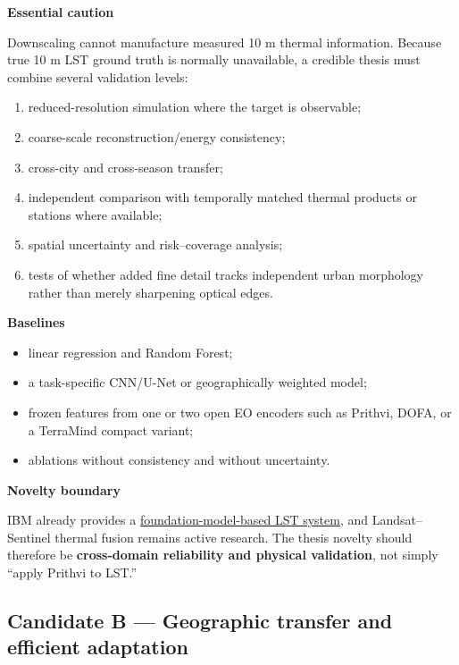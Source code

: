 \documentclass[
  a4paper,
  11pt]{article}
\providecommand{\tightlist}{%
  \setlength{\itemsep}{0pt}\setlength{\parskip}{0pt}}
\begin{document}
\textbf{Essential caution}

Downscaling cannot manufacture measured 10 m thermal information.
Because true 10 m LST ground truth is normally unavailable, a credible
thesis must combine several validation levels:

\begin{enumerate}
\def\labelenumi{\arabic{enumi}.}
\tightlist
\item
  reduced-resolution simulation where the target is observable;
\item
  coarse-scale reconstruction/energy consistency;
\item
  cross-city and cross-season transfer;
\item
  independent comparison with temporally matched thermal products or
  stations where available;
\item
  spatial uncertainty and risk--coverage analysis;
\item
  tests of whether added fine detail tracks independent urban morphology
  rather than merely sharpening optical edges.
\end{enumerate}

\textbf{Baselines}

\begin{itemize}
\tightlist
\item
  linear regression and Random Forest;
\item
  a task-specific CNN/U-Net or geographically weighted model;
\item
  frozen features from one or two open EO encoders such as Prithvi,
  DOFA, or a TerraMind compact variant;
\item
  ablations without consistency and without uncertainty.
\end{itemize}

\textbf{Novelty boundary}

IBM already provides a
\href{https://github.com/ibm-granite/granite-geospatial-land-surface-temperature}{foundation-model-based
LST system}, and Landsat--Sentinel thermal fusion remains active
research. The thesis novelty should therefore be \textbf{cross-domain
reliability and physical validation}, not simply ``apply Prithvi to
LST.''

\hypertarget{candidate-b-geographic-transfer-and-efficient-adaptation}{%
\subsection{Candidate B --- Geographic transfer and efficient
adaptation}\label{candidate-b-geographic-transfer-and-efficient-adaptation}}
\end{document}
